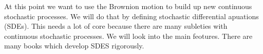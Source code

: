 At this point we want to use the Brownion motion to build up new continuous stochastic processes. We will do that by defining stochastic differential apuations (SDEs). This needs a lot of core because there are many subleties with continuous stochastic processes. We will look into the main feotures. There are many books which develop SDES rigorously.